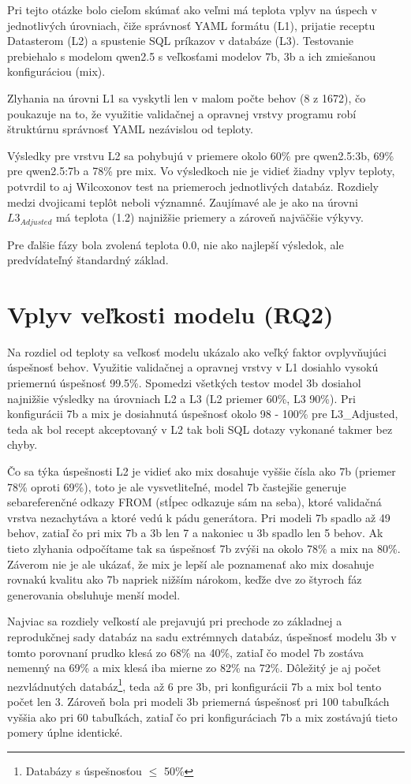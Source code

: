 Pri tejto otázke bolo cieľom skúmať ako veľmi má teplota vplyv na úspech v jednotlivých úrovniach, čiže správnosť YAML formátu (L1), prijatie receptu Datasterom (L2)  a spustenie SQL príkazov v databáze (L3). Testovanie prebiehalo s modelom qwen2.5 s veľkosťami modelov 7b, 3b a ich zmiešanou konfiguráciou (mix).


Zlyhania na úrovni L1 sa vyskytli len v malom počte behov (8 z 1672), čo poukazuje na to, že využitie validačnej a opravnej vrstvy programu robí štruktúrnu správnosť YAML nezávislou od teploty.


Výsledky pre vrstvu L2 sa pohybujú v priemere okolo 60\% pre qwen2.5:3b, 69\% pre qwen2.5:7b a 78\% pre mix. Vo výsledkoch nie je vidieť žiadny vplyv teploty, potvrdil to aj Wilcoxonov test na priemeroch jednotlivých databáz. Rozdiely medzi dvojicami teplôt neboli významné.  Zaujímavé ale je ako na úrovni $L3_{Adjusted}$ má teplota (1.2) najnižšie priemery a zároveň najväčšie výkyvy. 


Pre ďalšie fázy bola zvolená teplota 0.0, nie ako najlepší výsledok, ale predvídateľný štandardný základ.

\section{Vplyv veľkosti modelu (RQ2)}
\label{sub:odpoved_rq2}
Na rozdiel od teploty sa veľkosť modelu ukázalo ako veľký faktor ovplyvňujúci úspešnosť behov. Využitie validačnej a opravnej vrstvy v L1 dosiahlo vysokú priemernú úspešnosť 99.5\%. Spomedzi všetkých testov model 3b dosiahol najnižšie výsledky na úrovniach L2 a L3 (L2 priemer 60\%, L3 90\%). Pri konfigurácii 7b a mix je dosiahnutá úspešnosť okolo 98 - 100\% pre L3\_Adjusted, teda ak bol recept akceptovaný v L2 tak boli SQL dotazy vykonané takmer bez chyby.


Čo sa týka úspešnosti L2 je vidieť ako mix dosahuje vyššie čísla ako 7b (priemer 78\% oproti 69\%), toto je ale vysvetliteľné, model 7b častejšie generuje sebareferenčné odkazy FROM (stĺpec odkazuje sám na seba), ktoré validačná vrstva nezachytáva a ktoré vedú k pádu generátora. Pri modeli 7b spadlo až 49 behov, zatiaľ čo pri mix 7b a 3b len 7 a nakoniec u 3b spadlo len 5 behov. Ak tieto zlyhania odpočítame tak sa úspešnosť 7b zvýši na okolo 78\% a mix na 80\%. Záverom nie je ale ukázať, že mix  je lepší ale poznamenať ako mix dosahuje rovnakú kvalitu ako 7b napriek nižším nárokom, keďže dve zo štyroch fáz generovania obsluhuje menší model.


Najviac sa rozdiely veľkostí ale prejavujú pri prechode zo základnej a reprodukčnej sady databáz na sadu extrémnych databáz, úspešnosť modelu 3b v tomto porovnaní prudko klesá zo 68\% na 40\%, zatiaľ čo model 7b zostáva nemenný na 69\% a mix klesá iba mierne zo 82\% na 72\%. Dôležitý je aj počet nezvládnutých databáz\footnote{Databázy s úspešnosťou $\leq$ 50\%}, teda až 6 pre 3b, pri konfigurácii 7b a mix bol tento počet len 3. Zároveň bola pri modeli 3b priemerná úspešnosť pri 100 tabuľkách vyššia ako pri 60 tabuľkách, zatiaľ čo pri konfiguráciach 7b a mix zostávajú tieto pomery úplne identické.



